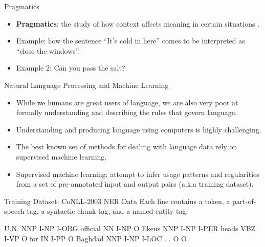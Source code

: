 \documentclass[handout]{beamer}
\begin{document}
\begin{frame}{Pragmatics}
\scriptsize{
\begin{itemize}
\item \textbf{Pragmatics}: the study of how context affects meaning in certain situations \cite{fromkin2018introduction}.
\item Example: how the sentence ``It’s cold in here'' comes to be interpreted as ``close the windows''.
\item Example 2: Can you pass the salt?
\end{itemize}

}


\end{frame}


\begin{frame}{Natural Language Processing and Machine Learning}
\begin{scriptsize}
\begin{itemize}

\item While we humans are great users of language, we are also very poor at formally understanding and describing the rules that govern  language.

\item  Understanding and producing language using computers is highly challenging.
\item The best known set of methods for dealing with language data rely on supervised machine learning.
\item Supervised machine learning: attempt to infer usage patterns and regularities from a set of pre-annotated input and output pairs (a.k.a training dataset).

\end{itemize}
\end{scriptsize}
\end{frame}


\begin{frame}[fragile]{Training Dataset: CoNLL-2003 NER Data}
Each line contains a token, a part-of-speech tag, a syntactic chunk tag, and a named-entity tag.
\begin{center}
\begin{semiverbatim}
U.N.         NNP  I-NP  I-ORG 
official     NN   I-NP  O
Ekeus        NNP  I-NP  I-PER
heads        VBZ  I-VP  O
for          IN   I-PP  O
Baghdad      NNP  I-NP  I-LOC
.            .    O     O
\end{semiverbatim}
\end{center}


\end{frame}
\end{document}
